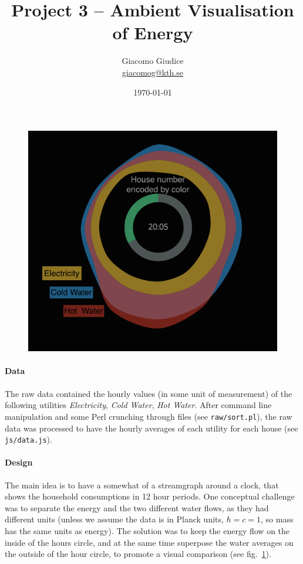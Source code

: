 \documentclass[a4paper,12pt,twoside]{article}
\newcommand{\mail}[1]{{\href{mailto:#1}{#1}}}
\begin{document}
\title{Project 3 -- Ambient Visualisation of Energy}
\date{\today}
\author{ Giacomo Giudice\\{ \small \mail{giacomog@kth.se}}}
\maketitle

\baselineskip=16pt
\parindent=15pt
\parskip=5pt
\begin{figure}[H]
\centering
{
\includegraphics[width=13cm,angle=0]{view.png}
}
\caption{\label{v}}
\end{figure}
\paragraph{Data}
The raw data contained the hourly values (in some unit of measurement) of the following utilities {\em Electricity}, {\em Cold Water}, {\em Hot Water}.
After command line manipulation and some Perl crunching through files (see {\tt raw/sort.pl}), the raw data was processed to have the hourly averages of each utility for each house (see {\tt js/data.js}). 

\paragraph{Design} The main idea is to have a somewhat of a streamgraph around a clock, that shows the household consumptions in 12 hour periods. One conceptual challenge was to  separate the energy and the two different water flows, as they had different units (unless we assume the data is in Planck units, $\hbar = c  = 1$, so mass has the same units as energy). The solution was to keep the energy flow on the inside of the hours circle, and at the same time superpose the water averages on the outside of the hour circle, to promote a visual comparison (see fig.~\ref{v}).
\end{document}
